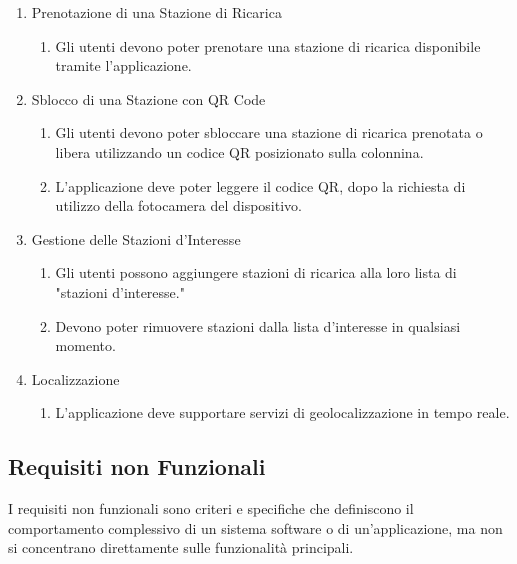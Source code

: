 \begin{enumerate}[label=\arabic*.]
    \item Prenotazione di una Stazione di Ricarica
          \begin{enumerate}[label=\arabic{enumi}.\arabic*]
              \item Gli utenti devono poter prenotare una stazione di ricarica disponibile tramite l'applicazione.
          \end{enumerate}

    \item Sblocco di una Stazione con QR Code
          \begin{enumerate}[label=\arabic{enumi}.\arabic*]
              \item Gli utenti devono poter sbloccare una stazione di ricarica prenotata o libera utilizzando un codice QR posizionato sulla colonnina.
              \item L'applicazione deve poter leggere il codice QR, dopo la richiesta di utilizzo della fotocamera del dispositivo.
          \end{enumerate}

    \item Gestione delle Stazioni d'Interesse
          \begin{enumerate}[label=\arabic{enumi}.\arabic*]
              \item Gli utenti possono aggiungere stazioni di ricarica alla loro lista di "stazioni d'interesse."
              \item Devono poter rimuovere stazioni dalla lista d'interesse in qualsiasi momento.
          \end{enumerate}

    \item Localizzazione
          \begin{enumerate}[label=\arabic{enumi}.\arabic*]
              \item L'applicazione deve supportare servizi di geolocalizzazione in tempo reale.
          \end{enumerate}
\end{enumerate}

\subsection{Requisiti non Funzionali}
I requisiti non funzionali sono criteri e specifiche che definiscono il comportamento complessivo di un sistema software o di un'applicazione, ma non si concentrano direttamente sulle funzionalità principali.

